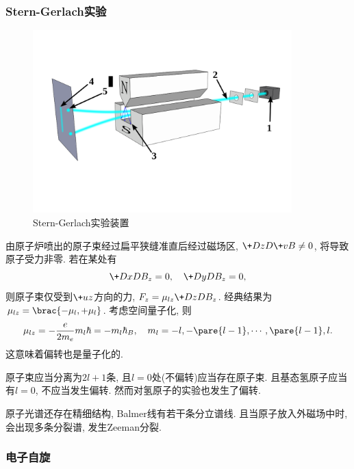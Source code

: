 \documentclass[hidelinks]{ctexart}
\begin{document}

\subsubsection{Stern-Gerlach实验} %
\label{ssub:stern_gerlach实验}

\begin{figure}[ht]
    \centering
    \includegraphics[width=10cm]{src/SternGerlach.png}
    \caption{Stern-Gerlach实验装置}
\end{figure}
由原子炉喷出的原子束经过扁平狭缝准直后经过磁场区, $\displaystyle \+DzD{\+vB}\neq 0$, 将导致原子受力非零. 若在某处有
\[ \+DxD{B_z} = 0,\quad \+DyD{B_z} = 0, \]
则原子束仅受到$\+uz$方向的力, $\displaystyle F_z = \mu_{lz}\+DzD{B_z}$. 经典结果为$\mu_{lz} = \brac{-\mu_{l},+\mu_{l}}$. 考虑空间量子化, 则
\[ \mu_{lz} = -\frac{e}{2m_e}m_l \hbar = -m_l \hbar_B,\quad m_l = -l,-\pare{l-1}, \cdots, \pare{l-1}, l. \]
这意味着偏转也是量子化的.
\par
原子束应当分离为$2l+1$条, 且$l=0$处(不偏转)应当存在原子束. 且基态氢原子应当有$l=0$, 不应当发生偏转. 然而对氢原子的实验也发生了偏转.
\par
原子光谱还存在精细结构, Balmer线有若干条分立谱线. 且当原子放入外磁场中时, 会出现多条分裂谱, 发生Zeeman分裂.


\subsubsection{电子自旋} %
\label{ssub:电子自旋}
\end{document}
